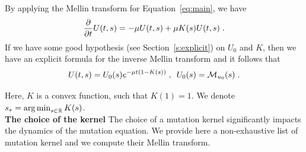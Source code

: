 \documentclass[11pt]{amsart}
\begin{document}
By applying the Mellin transform for Equation~\eqref{eq:main}, we have
	\begin{equation}
		\frac{\partial}{\partial t} U(t,s) = - \mu U(t,s) + \mu K(s) U(t,s)
		\; .
        \label{eq:explicit_reconstruction}
	\end{equation}
If we have some good hypothesis (see Section~\ref{s:explicit}) on $U_0$ and $K$, then we have an explicit formula for the inverse Mellin transform and it follows that
    \begin{equation*}
        U(t,s) = U_0(s) e^{-\mu t(1 - K(s) ) }
        \; , \enspace
        U_0(s) = \mathcal{M}_{u_0}(s)
        \; .
    \end{equation*}

Here, $K$ is a convex function, such that $K(1) = 1$. We denote $s_* = \mathop{\arg\min}_{s\in \mathbb{R}} K(s)$. \\

\textbf{The choice of the kernel}
The choice of a mutation kernel significantly impacts the dynamics of the mutation equation. We provide here a non-exhaustive list of mutation kernel and we compute their Mellin transform. \\
\end{document}
